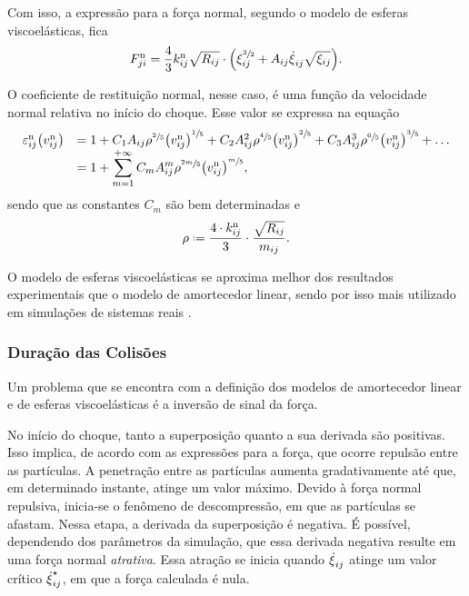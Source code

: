 Com isso, a expressão para a força normal, segundo o modelo de esferas viscoelásticas, fica
\begin{equation*}
	\normalForceScalarji = \dfrac{4}{3}\effectiveNormalElasticij\sqrt{\effectiveRadiusij}\cdot\pqty{
		\overlapij^{\sfrac{3}{2}} + \normalDissipativeConstantij\overlapDerivativeij\sqrt{\overlapij}
	}.
\end{equation*}

O coeficiente de restituição normal, nesse caso, é uma função da velocidade normal relativa no início do choque. Esse valor se expressa na equação
\begin{equation*}
	\begin{array}{rl}
	\normalCoefficientOfRestitutionij\pqty{\beforeCollision{\relativeNormalVelocityScalarij}} & = 
	1
	+ C_1 \normalDissipativeConstantij\rho^{\sfrac{2}{5}}\pqty{\relativeNormalVelocityScalarij}^{\sfrac{1}{5}}
	+ C_2 \normalDissipativeConstantij^2 \rho^{\sfrac{4}{5}}\pqty{\relativeNormalVelocityScalarij}^{\sfrac{2}{5}}
	+ C_3 \normalDissipativeConstantij^3 \rho^{\sfrac{6}{5}}\pqty{\relativeNormalVelocityScalarij}^{\sfrac{3}{5}}
	+ \dots \\
	& \displaystyle = 1 + \sum_{m=1}^{+\infty} C_m \normalDissipativeConstantij^m \rho^{\sfrac{2m}{5}}\pqty{\relativeNormalVelocityScalarij}^{\sfrac{m}{5}},
	\end{array}
\end{equation*}
sendo que as constantes \(C_m\) são bem determinadas \cite[p. 143]{bib:computational_granular_dynamics} e
\begin{equation*}
	\rho \eqdef \dfrac{4\cdot\effectiveNormalElasticij}{3}\cdot\dfrac{\sqrt{\effectiveRadiusij}}{\massij}.
\end{equation*}

O modelo de esferas viscoelásticas se aproxima melhor dos resultados experimentais que o modelo de amortecedor linear, sendo por isso mais utilizado em simulações de sistemas reais \cite[p. 143]{bib:computational_granular_dynamics}.

\subsubsection*{Duração das Colisões}

Um problema que se encontra com a definição dos modelos de amortecedor linear e de esferas viscoelásticas é a inversão de sinal da força.

No início do choque, tanto a superposição quanto a sua derivada são positivas. Isso implica, de acordo com as expressões para a força, que ocorre repulsão entre as partículas. A penetração entre as partículas aumenta gradativamente até que, em determinado instante, atinge um valor máximo. Devido à força normal repulsiva, inicia-se o fenômeno de descompressão, em que as partículas se afastam. Nessa etapa, a derivada da superposição é negativa. É possível, dependendo dos parâmetros da simulação, que essa derivada negativa resulte em uma força normal \textit{atrativa}. Essa atração se inicia quando \(\overlapDerivativeij\) atinge um valor crítico \(\principal{\overlapDerivativeij}\), em que a força calculada é nula.

